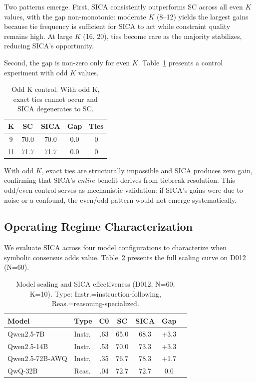 \documentclass[11pt,a4paper]{article}
\begin{document}
Two patterns emerge. First, SICA consistently outperforms SC across all even $K$ values, with the gap non-monotonic: moderate $K$ (8--12) yields the largest gains because tie frequency is sufficient for SICA to act while constraint quality remains high. At large $K$ (16, 20), ties become rare as the majority stabilizes, reducing SICA's opportunity.

Second, the gap is non-zero only for even $K$. Table~\ref{tab:odd_k} presents a control experiment with odd $K$ values.

\begin{table}[t]
\centering
\small
\begin{tabular}{ccccc}
\toprule
\textbf{K} & \textbf{SC} & \textbf{SICA} & \textbf{Gap} & \textbf{Ties} \\
\midrule
9  & 70.0 & 70.0 & 0.0 & 0 \\
11 & 71.7 & 71.7 & 0.0 & 0 \\
\bottomrule
\end{tabular}
\caption{Odd K control. With odd K, exact ties cannot occur and SICA degenerates to SC.}
\label{tab:odd_k}
\end{table}

With odd $K$, exact ties are structurally impossible and SICA produces zero gain, confirming that SICA's \emph{entire} benefit derives from tiebreak resolution. This odd/even control serves as mechanistic validation: if SICA's gains were due to noise or a confound, the even/odd pattern would not emerge systematically.

\subsection{Operating Regime Characterization}
\label{sec:regime}

We evaluate SICA across four model configurations to characterize when symbolic consensus adds value. Table~\ref{tab:scaling} presents the full scaling curve on D012 (N=60).

\begin{table}[t]
\centering
\small
\begin{tabular}{llccccc}
\toprule
\textbf{Model} & \textbf{Type} & \textbf{C0} & \textbf{SC} & \textbf{SICA} & \textbf{Gap} \\
\midrule
Qwen2.5-7B   & Instr. & .63 & 65.0 & 68.3 & +3.3 \\
Qwen2.5-14B  & Instr. & .53 & 70.0 & 73.3 & +3.3 \\
Qwen2.5-72B-AWQ & Instr. & .35 & 76.7 & 78.3 & +1.7 \\
QwQ-32B       & Reas.  & .04 & 72.7 & 72.7 & 0.0 \\
\bottomrule
\end{tabular}
\caption{Model scaling and SICA effectiveness (D012, N=60, K=10). Type: Instr.=instruction-following, Reas.=reasoning-specialized.}
\label{tab:scaling}
\end{table}
\end{document}
